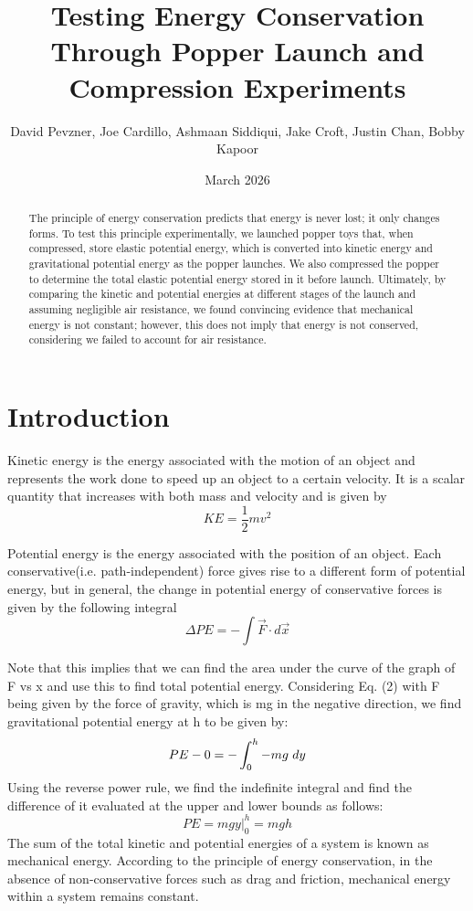\documentclass{article}
\title{Testing Energy Conservation Through Popper Launch and Compression Experiments}
\author{David Pevzner, Joe Cardillo, Ashmaan Siddiqui, Jake Croft, Justin Chan, Bobby Kapoor}
\date{March 2026}
\begin{document}
\maketitle

\begin{abstract}
    The principle of energy conservation predicts that energy is never lost; it only changes forms. To test this principle experimentally, we launched popper toys that, when compressed, store elastic potential energy, which is converted into kinetic energy and gravitational potential energy as the popper launches. We also compressed the popper to determine the total elastic potential energy stored in it before launch. Ultimately, by comparing the kinetic and potential energies at different stages of the launch and assuming negligible air resistance, we found convincing evidence that mechanical energy is not constant; however, this does not imply that energy is not conserved, considering we failed to account for air resistance. 
\end{abstract}

\section{Introduction}

Kinetic energy is the energy associated with the motion of an object and represents the work done to speed up an object to a certain velocity. It is a scalar quantity that increases with both mass and velocity and is given by 
\begin{equation}
    KE = \frac{1}{2}mv^2
\end{equation}

Potential energy is the energy associated with the position of an object. Each conservative(i.e. path-independent) force gives rise to a different form of potential energy, but in general, the change in potential energy of conservative forces is given by the following integral
\begin{equation}
    \Delta PE = -\int\vec{F}\cdot d \vec{x}
\end{equation}

Note that this implies that we can find the area under the curve of the graph of F vs x and use this to find total potential energy. Considering Eq. (2) with F being given by the force of gravity, which is mg in the negative direction, we find gravitational potential energy at h to be given by:
\begin{equation}
    PE - 0 = -\int_0^h -mg \hspace{3 pt} dy 
\end{equation}
Using the reverse power rule, we find the indefinite integral and find the difference of it evaluated at the upper and lower bounds as follows:
\begin{equation}
    PE = mgy \bigg|^h_0 = mgh
\end{equation}
The sum of the total kinetic and potential energies of a system is known as mechanical energy. According to the principle of energy conservation, in the absence of non-conservative forces such as drag and friction, mechanical energy within a system remains constant. 
\end{document}
